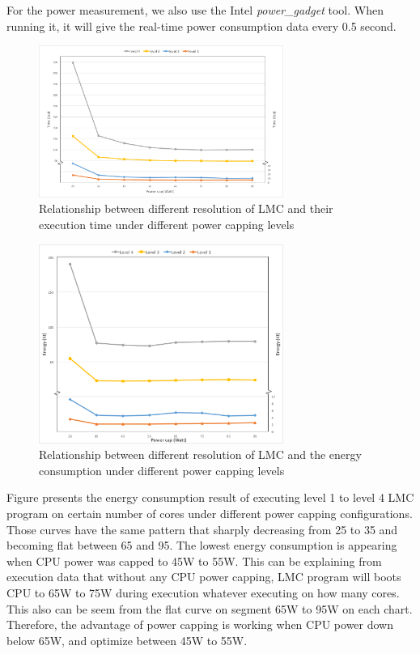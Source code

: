 \documentclass[10pt, conference, compsocconf]{IEEEtran}
\begin{document}
For the power measurement, we also use the Intel \textit{power\_gadget} tool. When running it, it will give the real-time power consumption data every 0.5 second.



\noindent
\begin{figure}[H]
	\centering
    \includegraphics[width=8cm]{figs/CAPER_lev1-4_power_cap_time_edited.png}
        \caption{Relationship between different resolution of LMC and their execution time under different power capping levels}
        \label{fig:RAPLpowercaptime}
\end{figure}

\begin{figure}[H]
	\centering
    \includegraphics[width=8cm]{figs/CAPER_lev1-4_power_cap_energy_edited.png}
        \caption{Relationship between different resolution of LMC and the energy consumption under different power capping levels}
        \label{fig:RAPLpowercappower}
\end{figure}

\noindent

Figure presents the energy consumption result of executing level 1 to level 4 LMC program on certain number of cores under different power capping configurations. Those curves have the same pattern that sharply decreasing from 25 to 35 and becoming flat between 65 and 95. The lowest energy consumption is appearing when CPU power was capped to 45W to 55W. This can be explaining from execution data that without any CPU power capping, LMC program will boots CPU to 65W to 75W during execution whatever executing on how many cores. This also can be seem from the flat curve on segment 65W to 95W on each chart. Therefore, the advantage of power capping is working when CPU power down below 65W, and optimize between 45W to 55W. 
\end{document}
